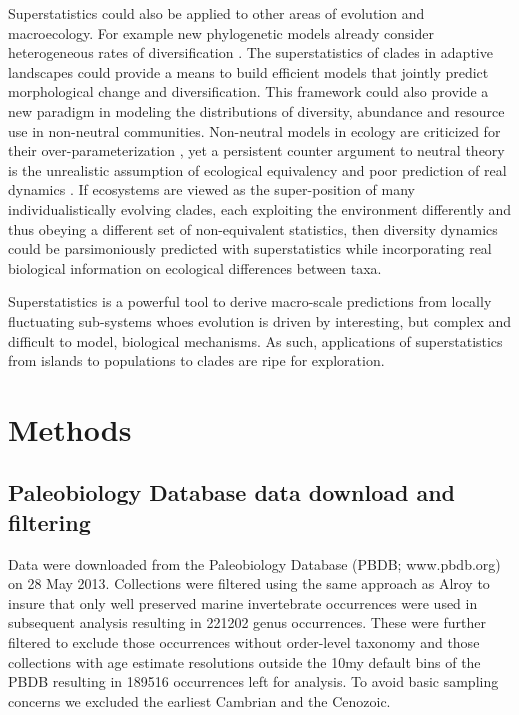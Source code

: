 \documentclass[12pt]{article}
\let\citep=\cite
\begin{document}
Superstatistics could also be applied to other areas of evolution and
macroecology.  For example new phylogenetic models already consider
heterogeneous rates of diversification
\citep[e.g.][]{rabosky2006laser}. The superstatistics of clades in
adaptive landscapes could provide a means to build efficient models
that jointly predict morphological change and diversification. This
framework could also provide a new paradigm in modeling the
distributions of diversity, abundance and resource use in non-neutral
communities. Non-neutral models in ecology are criticized for their
over-parameterization \citep{rosindell2011}, yet a persistent
counter argument to neutral theory \citep{hubbell2001} is the
unrealistic assumption of ecological equivalency
\citep{chave2004neutral} and poor prediction of real dynamics
\citep{ricklefs2006neutral}. If ecosystems are viewed as the
super-position of many individualistically evolving clades, each
exploiting the environment differently and thus obeying a different
set of non-equivalent statistics, then diversity dynamics could be
parsimoniously predicted with superstatistics while incorporating real
biological information on ecological differences between taxa.

Superstatistics is a powerful tool to derive macro-scale predictions
from locally fluctuating sub-systems whoes evolution is driven by
interesting, but complex and difficult to model, biological
mechanisms. As such, applications of superstatistics from islands to
populations to clades are ripe for exploration.


\section*{Methods}

\subsection*{Paleobiology Database data download and filtering}
Data were downloaded from the Paleobiology Database (PBDB;
www.pbdb.org) on 28 May 2013. Collections were filtered using the same
approach as Alroy \citep{alroy08} to insure that only well preserved
marine invertebrate occurrences were used in subsequent analysis
resulting in 221202 genus occurrences. These were further filtered to
exclude those occurrences without order-level taxonomy and those
collections with age estimate resolutions outside the 10my default
bins of the PBDB resulting in 189516 occurrences left for analysis. To
avoid basic sampling concerns we excluded the earliest Cambrian and
the Cenozoic.
\end{document}

